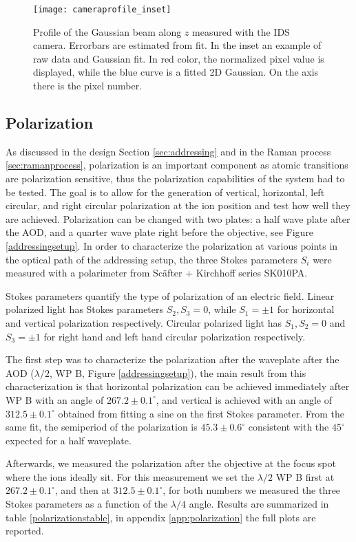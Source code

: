 \begin{figure}
\centering
\texttt{[image: cameraprofile\_inset]}
\caption{Profile of the Gaussian beam along $z$ measured with the IDS camera. Errorbars are estimated from fit. In the inset an example of raw data and Gaussian fit. In red color, the normalized pixel value is displayed, while the blue curve is a fitted 2D Gaussian. On the axis there is the pixel number.}
\label{cameraprofile}
\end{figure}

\subsection{Polarization}
\label{sec:polarization}
As discussed in the design Section \ref{sec:addressing} and in the Raman process \ref{sec:ramanprocess}, polarization is an important component as atomic transitions are polarization sensitive, thus the polarization capabilities of the system had to be tested. The goal is to allow for the generation of vertical, horizontal, left circular, and right circular polarization at the ion position and test how well they are achieved. Polarization can be changed with two plates: a half wave plate after the AOD, and a quarter wave plate right before the objective, see Figure \ref{addressingsetup}. In order to characterize the polarization at various points in the optical path of the addressing setup, the three Stokes parameters $S_i$ \cite{stokes} were measured with a polarimeter from Sc\"after + Kirchhoff series SK010PA.\par
Stokes parameters quantify the type of polarization of an electric field. Linear polarized light has Stokes parameters $S_2,S_3 = 0$, while $S_1 = \pm 1$ for horizontal and vertical polarization respectively. Circular polarized light has $S_1, S_2 = 0$ and $S_3=\pm 1$ for right hand and left hand circular polarization respectively.\par
The first step was to characterize the polarization after the waveplate after the AOD ($\lambda/2$, WP B, Figure \ref{addressingsetup}), the main result from this characterization is that horizontal polarization can be achieved immediately after WP B with an angle of $267.2\pm 0.1 ^{\circ}$, and vertical is achieved with an angle of $312.5\pm0.1^{\circ}$ obtained from fitting a sine on the first Stokes parameter. From the same fit, the semiperiod of the polarization is $45.3\pm 0.6^\circ$ consistent with the $45^\circ$ expected for a half waveplate.\par
Afterwards, we measured the polarization after the objective at the focus spot where the ions ideally sit. For this measurement we set the $\lambda/2$ WP B first at $267.2\pm 0.1^\circ$, and then at $312.5\pm0.1^{\circ}$, for both numbers we measured the three Stokes parameters as a function of the $\lambda/4$ angle. Results are summarized in table \ref{polarizationstable}, in appendix \ref{app:polarization} the full plots are reported.
